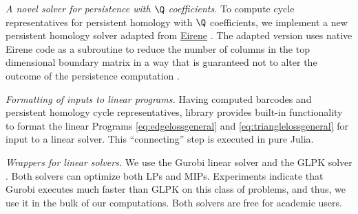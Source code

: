 \emph{A novel solver for persistence with $\Q$ coefficients.} To compute cycle representatives for persistent homology with $\Q$ coefficients, we implement a new persistent homology solver adapted from  \url{Eirene}  \cite{eirenecode}.  The adapted version uses native Eirene code as a subroutine to reduce the number of columns in the top dimensional boundary matrix in a way that is guaranteed not to alter the outcome of the persistence computation \cite{eirene}.

\emph{Formatting of inputs to linear programs.} 
Having computed barcodes and persistent homology cycle representatives, library \cite{li_thompson}  provides built-in functionality to format the linear Programs \eqref{eq:edgelossgeneral} and \eqref{eq:trianglelossgeneral} for input to a linear solver.  This ``connecting'' step is executed in pure Julia.


\emph{Wrappers for linear solvers.} \label{linear solvers}
We use the Gurobi linear solver \cite{gurobi} and the GLPK  solver \cite{glpk}. Both solvers can optimize both LPs and MIPs. Experiments indicate that Gurobi executes much faster than GLPK on this class of problems, and thus, we use it in the bulk of our computations. Both solvers are free for academic users. 



